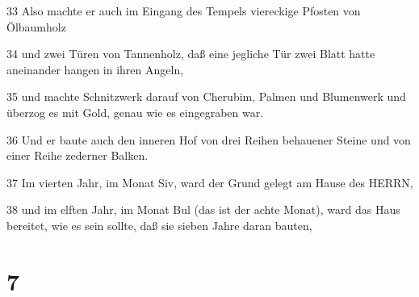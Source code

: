 \par 33 Also machte er auch im Eingang des Tempels viereckige Pfosten von Ölbaumholz
\par 34 und zwei Türen von Tannenholz, daß eine jegliche Tür zwei Blatt hatte aneinander hangen in ihren Angeln,
\par 35 und machte Schnitzwerk darauf von Cherubim, Palmen und Blumenwerk und überzog es mit Gold, genau wie es eingegraben war.
\par 36 Und er baute auch den inneren Hof von drei Reihen behauener Steine und von einer Reihe zederner Balken.
\par 37 Im vierten Jahr, im Monat Siv, ward der Grund gelegt am Hause des HERRN,
\par 38 und im elften Jahr, im Monat Bul (das ist der achte Monat), ward das Haus bereitet, wie es sein sollte, daß sie sieben Jahre daran bauten,

\chapter{7}

